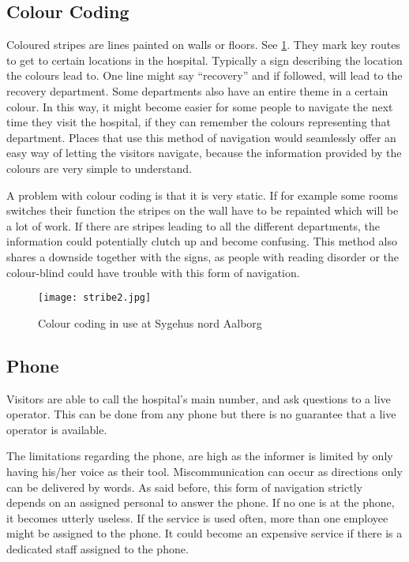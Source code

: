 \subsection{Colour Coding}\label{sub:col}
Coloured stripes are lines painted on walls or floors. See \cref{fig:colour_floor}. They mark key routes to get to certain locations in the hospital. Typically a sign describing the location the colours lead to. One line might say \enquote{recovery} and if followed, will lead to the recovery department. Some departments also have an entire theme in a certain colour. In this way, it might become easier for some people to navigate the next time they visit the hospital, if they can remember the colours representing that department.
Places that use this method of navigation would seamlessly offer an easy way of letting the visitors navigate, because the information provided by the colours are very simple to understand.

A problem with colour coding is that it is very static. If for example some rooms switches their function the stripes on the wall have to be repainted which will be a lot of work. If there are stripes leading to all the different departments, the information could potentially clutch up and become confusing. This method also shares a downside together with the signs, as people with reading disorder  or the colour-blind could have trouble with this form of navigation.

\begin{figure}[htb]
  \begin{center} 
    \texttt{[image: stribe2.jpg]}
  \end{center}
  \caption{Colour coding in use at Sygehus nord Aalborg}
  \label{fig:colour_floor}
\end{figure}




\subsection{Phone}\label{sub:pho}

Visitors are able to call the hospital's main number, and ask questions to a live operator. This can be done from any phone but there is no guarantee that a live operator is available. \cite{sign_ring}
 
The limitations regarding the phone, are high as the informer is limited by only having his/her voice as their tool. Miscommunication can occur as directions only can be delivered by words. As said before, this form of navigation strictly depends on an assigned personal to answer the phone. If no one is at the phone, it becomes utterly useless.
If the service is used often, more than one employee might be assigned to the phone. It could become an expensive service if there is a dedicated staff assigned to the phone.


